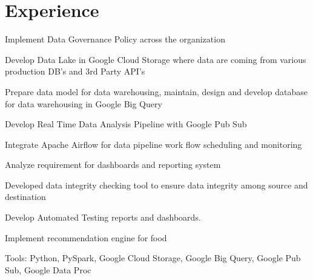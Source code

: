 \documentclass[letterpaper]{deedy-resume} %
\begin{document}
\hfill
%
%
\begin{minipage}[t]{0.66\textwidth} %


\section{Experience}


\vspace{\topsep} %
\begin{tightitemize}
\item Implement Data Governance Policy across the organization
\item Develop Data Lake in Google Cloud Storage where data are coming from various production DB's and 3rd Party API's
\item Prepare data model for data warehousing, maintain, design and develop database for data warehousing in Google Big Query
\item Develop Real Time Data Analysis Pipeline with Google Pub Sub 
\item Integrate Apache Airflow for data pipeline work flow scheduling and monitoring
\item Analyze requirement for dashboards and reporting system
\item Developed data integrity checking tool to ensure data integrity among source and destination
\item Develop Automated Testing reports and dashboards.
\item Implement recommendation engine for food 
\item Tools: Python, PySpark, Google Cloud Storage, Google Big Query, Google Pub Sub, Google Data Proc

\end{tightitemize}

\sectionspace %




\end{minipage}
\end{document}
